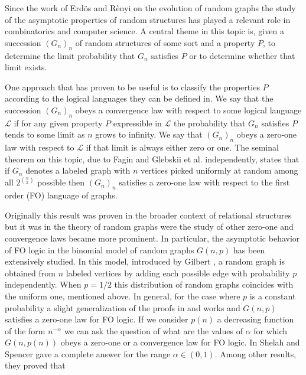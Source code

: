 \documentclass[12pt,notitlepage,a4paper]{article}
\theoremstyle{definition}
\begin{document}
Since the work of Erd\"os and R\`enyi on the evolution of random graphs
\cite{erdHos1960evolution} the study of the asymptotic properties of random
structures has played a relevant role in combinatorics and computer science.
A central theme in this topic is, given a succession $(G_n)_n$ of random
structures of some sort and a property $P$, to determine the limit probability
that $G_n$ satisfies $P$ or to determine whether that limit exists. \par
One approach that has proven to be useful is to classify the properties $P$
according to the logical languages they can be defined in. We say that the 
succession $(G_n)_n$ obeys a convergence law with respect to some logical language
$\mathcal{L}$ if for any given property $P$ expressible in $\mathcal{L}$ the 
probability that $G_n$ satisfies $P$ tends to some limit as $n$ grows to infinity.
We say that $(G_n)_n$ obeys a zero-one law with respect to $\mathcal{L}$ if
that limit is always either zero or one. 
The seminal theorem on this topic, due to Fagin \cite{fagin1976probabilities}
and Glebskii et al. 
\cite{glebskii1969range} independently, states that if $G_n$ denotes a labeled
graph with $n$ vertices picked uniformly at random among all $2^{\binom{n}{2}}$ 
possible then $(G_n)_n$ satisfies a zero-one law with respect to the first order
(FO) language of graphs. \par
Originally this result was proven in the broader context of relational
structures but it was in the theory of random graphs were the study of 
other zero-one and convergence laws became more prominent. In particular,
the asymptotic behavior of FO logic in the binomial model of random graphs 
$G(n,p)$ has been extensively studied. In this model, introduced by Gilbert 
\cite{gilbert1959random}, a random graph is obtained from $n$ labeled vertices
by adding each possible edge with probability $p$ independently. When $p=1/2$
this distribution of random graphs coincides with the uniform one, mentioned 
above. In general, for the case where $p$ is a constant probability a slight 
generalization of the proofs in \cite{fagin1976probabilities} and 
\cite{glebskii1969range} works and $G(n,p)$ satisfies a zero-one law 
for FO logic. If we consider $p(n)$ a decreasing function of the form
$n^{-\alpha}$ we can ask the question of what are the values of $\alpha$
for which $G(n,p(n))$ obeys a zero-one or a convergence law for FO logic. 
In \cite{shelah1988zero} Shelah and Spencer gave a complete answer 
for the range $\alpha\in (0,1)$. Among other results, they proved that
\end{document}
